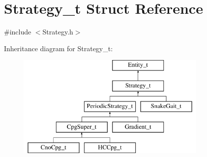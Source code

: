 \hypertarget{structStrategy__t}{
\section{Strategy\_\-t Struct Reference}
\label{structStrategy__t}
}


{\ttfamily \#include $<$Strategy.h$>$}

Inheritance diagram for Strategy\_\-t:\begin{figure}[H]
\begin{center}
\leavevmode
\includegraphics[height=5.000000cm]{structStrategy__t}
\end{center}
\end{figure}
